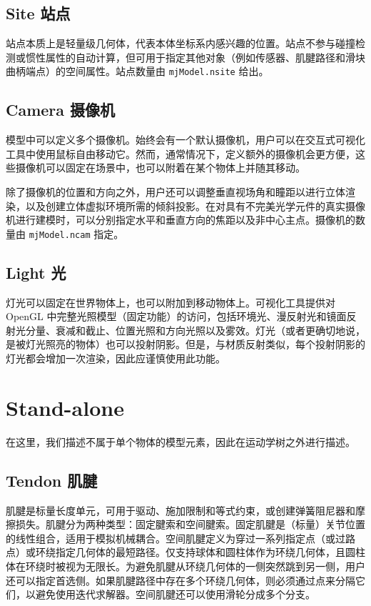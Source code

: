 \subsection{Site 站点}
站点本质上是轻量级几何体，代表本体坐标系内感兴趣的位置。站点不参与碰撞检测或惯性属性的自动计算，但可用于指定其他对象（例如传感器、肌腱路径和滑块曲柄端点）的空间属性。站点数量由 \texttt{mjModel.nsite} 给出。

\subsection{Camera 摄像机}
模型中可以定义多个摄像机。始终会有一个默认摄像机，用户可以在交互式可视化工具中使用鼠标自由移动它。然而，通常情况下，定义额外的摄像机会更方便，这些摄像机可以固定在场景中，也可以附着在某个物体上并随其移动。

除了摄像机的位置和方向之外，用户还可以调整垂直视场角和瞳距以进行立体渲染，以及创建立体虚拟环境所需的倾斜投影。在对具有不完美光学元件的真实摄像机进行建模时，可以分别指定水平和垂直方向的焦距以及非中心主点。摄像机的数量由 \texttt{mjModel.ncam} 指定。

\subsection{Light 光}
灯光可以固定在世界物体上，也可以附加到移动物体上。可视化工具提供对 OpenGL 中完整光照模型（固定功能）的访问，包括环境光、漫反射光和镜面反射光分量、衰减和截止、位置光照和方向光照以及雾效。灯光（或者更确切地说，是被灯光照亮的物体）也可以投射阴影。但是，与材质反射类似，每个投射阴影的灯光都会增加一次渲染，因此应谨慎使用此功能。

\section{Stand-alone}
在这里，我们描述不属于单个物体的模型元素，因此在运动学树之外进行描述。

\subsection{Tendon 肌腱}
肌腱是标量长度单元，可用于驱动、施加限制和等式约束，或创建弹簧阻尼器和摩擦损失。肌腱分为两种类型：固定腱索和空间腱索。固定肌腱是（标量）关节位置的线性组合，适用于模拟机械耦合。空间肌腱定义为穿过一系列指定点（或过路点）或环绕指定几何体的最短路径。仅支持球体和圆柱体作为环绕几何体，且圆柱体在环绕时被视为无限长。为避免肌腱从环绕几何体的一侧突然跳到另一侧，用户还可以指定首选侧。如果肌腱路径中存在多个环绕几何体，则必须通过点来分隔它们，以避免使用迭代求解器。空间肌腱还可以使用滑轮分成多个分支。

